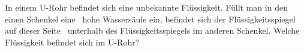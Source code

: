 In einem U-Rohr befindet sich eine unbekannte Flüssigkeit. Füllt man in den einen Schenkel eine \hWO\ hohe Wassersäule ein, befindet sich der Flüssigkeitsspiegel auf dieser Seite \hdiO\ unterhalb des Flüssigkeitsspiegels im anderen Schenkel. Welche Flüssigkeit befindet sich im U-Rohr?
